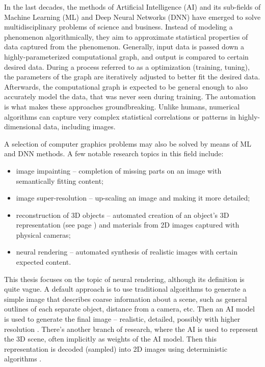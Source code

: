 In the last decades, the methods of Artificial Intelligence (AI) and its sub-fields of Machine Learning (ML) and Deep Neural Networks (DNN) have emerged to solve multidisciplinary problems of science and business. Instead of modeling a phenomenon algorithmically, they aim to approximate statistical properties of data captured from the phenomenon. Generally, input data is passed down a highly-parameterized computational graph, and output is compared to certain desired data. During a process referred to as a optimization (training, tuning), the parameters of the graph are iteratively adjusted to better fit the desired data. Afterwards, the computational graph is expected to be general enough to also accurately model the data, that was never seen during training. The automation is what makes these approaches groundbreaking. Unlike humans, numerical algorithms can capture very complex statistical correlations or patterns in highly-dimensional data, including images.

A selection of computer graphics problems may also be solved by means of ML and DNN methods. A few notable research topics in this field include:
\begin{itemize}
\item image impainting -- completion of missing parts on an image with semantically fitting content;
\item image super-resolution -- up-scaling an image and making it more detailed;
\item reconstruction of 3D objects -- automated creation of an object's 3D representation (see page \pageref{intro:3d-representations-paragraph}) and materials from 2D images captured with physical cameras;
\item neural rendering -- automated synthesis of realistic images with certain expected content.
\end{itemize}

This thesis focuses on the topic of neural rendering, although its definition is quite vague. A default approach is to use traditional algorithms to generate a simple image that describes coarse information about a scene, such as general outlines of each separate object, distance from a camera, etc. Then an AI model is used to generate the final image -- realistic, detailed, possibly with higher resolution \cite{dnn:deferred19}. There's another branch of research, where the AI is used to represent the 3D scene, often implicitly as weights of the AI model. Then this representation is decoded (sampled) into 2D images using deterministic algorithms \cite{dnn:nerf20}.
 
